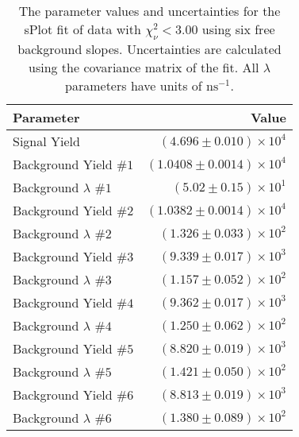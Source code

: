 
\begin{table}[h]
    \begin{center}
        \begin{tabular}{lr}\toprule
            Parameter & Value \\\midrule
            Signal Yield & $(4.696 \pm 0.010) \times 10^{4}$ \\
            Background Yield $\#1$ & $(1.0408 \pm 0.0014) \times 10^{4}$ \\
            Background $\lambda$ $\#1$ & $(5.02 \pm 0.15) \times 10^{1}$ \\
            Background Yield $\#2$ & $(1.0382 \pm 0.0014) \times 10^{4}$ \\
            Background $\lambda$ $\#2$ & $(1.326 \pm 0.033) \times 10^{2}$ \\
            Background Yield $\#3$ & $(9.339 \pm 0.017) \times 10^{3}$ \\
            Background $\lambda$ $\#3$ & $(1.157 \pm 0.052) \times 10^{2}$ \\
            Background Yield $\#4$ & $(9.362 \pm 0.017) \times 10^{3}$ \\
            Background $\lambda$ $\#4$ & $(1.250 \pm 0.062) \times 10^{2}$ \\
            Background Yield $\#5$ & $(8.820 \pm 0.019) \times 10^{3}$ \\
            Background $\lambda$ $\#5$ & $(1.421 \pm 0.050) \times 10^{2}$ \\
            Background Yield $\#6$ & $(8.813 \pm 0.019) \times 10^{3}$ \\
            Background $\lambda$ $\#6$ & $(1.380 \pm 0.089) \times 10^{2}$ \\\bottomrule
        \end{tabular}
        \caption{The parameter values and uncertainties for the sPlot fit of data with $\chi^2_\nu < 3.00$ using six free background slopes. Uncertainties are calculated using the covariance matrix of the fit. All $\lambda$ parameters have units of $\si{\nano\second}^{-1}$.}
    \end{center}
\end{table}
